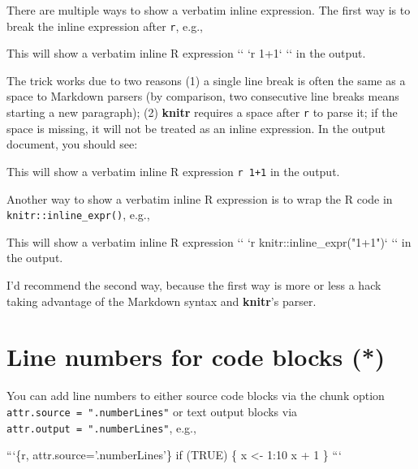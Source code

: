 \documentclass[
  11pt,
]{krantz}
\newenvironment{Shaded}{\begin{snugshade}}{\end{snugshade}}
\newcommand{\BaseNTok}[1]{\textcolor[rgb]{0.06,0.06,0.06}{#1}}
\newcommand{\NormalTok}[1]{#1}
\renewenvironment{quote}{\begin{VF}}{\end{VF}}
\begin{document}
There are multiple ways to show a verbatim inline expression. The first way is to break the inline expression after \texttt{\textasciigrave{}r}, e.g.,

\begin{Shaded}
\begin{Highlighting}[]
\NormalTok{This will show a verbatim inline R expression `}\BaseNTok{` `}\NormalTok{r}
\NormalTok{1+1}\BaseNTok{` `}\NormalTok{` in the output.}
\end{Highlighting}
\end{Shaded}

The trick works due to two reasons (1) a single line break is often the same as a space to Markdown parsers (by comparison, two consecutive line breaks means starting a new paragraph); (2) \textbf{knitr} requires a space after \texttt{\textasciigrave{}r} to parse it; if the space is missing, it will not be treated as an inline expression. In the output document, you should see:

\begin{quote}
This will show a verbatim inline R expression \texttt{\textasciigrave{}r\ 1+1\textasciigrave{}} in the output.
\end{quote}

Another way to show a verbatim inline R expression is to wrap the R code in \texttt{knitr::inline\_expr()}, e.g.,

\begin{Shaded}
\begin{Highlighting}[]
\NormalTok{This will show a verbatim inline R expression}
\NormalTok{`}\BaseNTok{` `}\NormalTok{r knitr::inline_expr("1+1")}\BaseNTok{` `}\NormalTok{` in the output.}
\end{Highlighting}
\end{Shaded}

I'd recommend the second way, because the first way is more or less a hack taking advantage of the Markdown syntax and \textbf{knitr}'s parser.

\hypertarget{number-lines}{%
\section{Line numbers for code blocks (*)}\label{number-lines}}

You can add line numbers to either source code blocks via the chunk option \texttt{attr.source\ =\ ".numberLines"} or text output blocks via \texttt{attr.output\ =\ ".numberLines"}, e.g.,

\begin{Shaded}
\begin{Highlighting}[]
\BaseNTok{```\{r, attr.source='.numberLines'\}}
\BaseNTok{if (TRUE) \{}
\BaseNTok{  x <- 1:10}
\BaseNTok{  x + 1}
\BaseNTok{\}}
\BaseNTok{```}
\end{Highlighting}
\end{Shaded}
\end{document}
